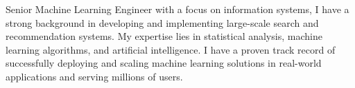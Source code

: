 \cvsection{}


\begin{cvparagraph}

Senior Machine Learning Engineer with a focus on information systems, I have a strong background in developing and implementing large-scale search and recommendation systems. My expertise lies in statistical analysis, machine learning algorithms, and artificial intelligence. I have a proven track record of successfully deploying and scaling machine learning solutions in real-world applications and serving millions of users.
\end{cvparagraph}